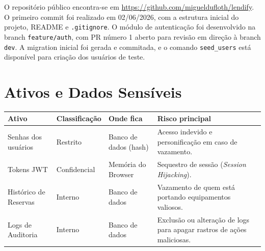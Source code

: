 \documentclass[12pt,a4paper]{article}
\begin{document}
O repositório público encontra-se em \url{https://github.com/migueldufloth/lendify}.
O primeiro commit foi realizado em 02/06/2026, com a estrutura inicial do projeto,
README e \texttt{.gitignore}. O módulo de autenticação foi desenvolvido na branch
\texttt{feature/auth}, com PR número 1 aberto para revisão em direção à branch
\texttt{dev}. A migration inicial foi gerada e commitada, e o comando
\texttt{seed\_users} está disponível para criação dos usuários de teste.

\section*{Ativos e Dados Sensíveis}

\begin{tabular}{@{}p{3cm}p{2.5cm}p{3cm}p{5.5cm}@{}}
\toprule
\textbf{Ativo} & \textbf{Classificação} & \textbf{Onde fica} & \textbf{Risco principal} \\
\midrule
Senhas dos usuários & Restrito & Banco de dados (hash) & Acesso indevido e personificação em caso de vazamento. \\
Tokens JWT & Confidencial & Memória do Browser & Sequestro de sessão (\textit{Session Hijacking}). \\
Histórico de Reservas & Interno & Banco de dados & Vazamento de quem está portando equipamentos valiosos. \\
Logs de Auditoria & Interno & Banco de dados & Exclusão ou alteração de logs para apagar rastros de ações maliciosas. \\
\bottomrule
\end{tabular}
\end{document}

